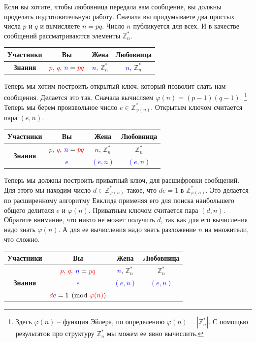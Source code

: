 Если вы хотите, чтобы любовница передала вам сообщение, вы должны проделать подготовительную работу. Сначала вы придумываете два простых числа $p$ и $q$ и вычисляете $n = pq$. Число $n$ публикуется для всех. И в качестве сообщений рассматриваются элементы $\mathbb Z_n^*$.
\begin{center}
\begin{tabular}{|c|c|c|c|}
\hline
{\bf Участники}&{Вы}&{Жена}&{Любовница}\\
\hline
{\bf Знания}&{\textcolor{red}{$p$, $q$}, $\textcolor{blue}{n} = \textcolor{red}{pq}$}&{\textcolor{blue}{$n$}, $\mathbb Z_n^*$}&{\textcolor{blue}{$n$}, $\mathbb Z_n^*$}\\
\hline
\end{tabular}
\end{center}

Теперь мы хотим построить открытый ключ, который позволит слать нам сообщения. Делается это так. Сначала вычисляем $\varphi(n) = (p-1)(q-1)$.%
\footnote{Здесь $\varphi(n)$ -- функция Эйлера, по определению $\varphi(n) = |\mathbb Z_n^*|$. С помощью результатов про структуру $\mathbb Z_n^*$ мы можем ее явно вычислить.}
Теперь мы берем произвольное число $e\in \mathbb Z_{\varphi(n)}^*$. Открытым ключом считается пара $(e, n)$.
\begin{center}
\begin{tabular}{|c|c|c|c|}
\hline
{\bf Участники}&{Вы}&{Жена}&{Любовница}\\
\hline
\multirow{2}{*}{\bf Знания}&{\textcolor{red}{$p$, $q$}, $\textcolor{blue}{n} = \textcolor{red}{pq}$}&{\textcolor{blue}{$n$}, $\mathbb Z_n^*$}&{$\mathbb Z_n^*$}\\
{}&{\textcolor{blue}{$e$}}&{\textcolor{blue}{$(e, n)$}}&{\textcolor{blue}{$(e, n)$}}\\
\hline
\end{tabular}
\end{center}

Теперь мы должны построить приватный ключ, для расшифровки сообщений. Для этого мы находим число $d\in \mathbb Z_{\varphi(n)}^*$ такое, что $de = 1$ в $\mathbb Z_{\varphi(n)}^*$. Это делается по расширенному алгоритму Евклида применяя его для поиска наибольшего общего делителя $e$ и $\varphi(n)$.
Приватным ключом считается пара $(d, n)$. Обратите внимание, что никто не может получить $d$, так как для его вычисления надо знать $\varphi(n)$. А для ее вычисления надо знать разложение $n$ на множители, что сложно.
\begin{center}
\begin{tabular}{|c|c|c|c|}
\hline
{\bf Участники}&{Вы}&{Жена}&{Любовница}\\
\hline
\multirow{3}{*}{\bf Знания}&{\textcolor{red}{$p$, $q$}, $\textcolor{blue}{n} = \textcolor{red}{pq}$}&{\textcolor{blue}{$n$}, $\mathbb Z_n^*$}&{$\mathbb Z_n^*$}\\
{}&{\textcolor{blue}{$e$}}&{\textcolor{blue}{$(e, n)$}}&{\textcolor{blue}{$(e, n)$}}\\
{}&{$\textcolor{red}{d}\textcolor{blue}{e} = 1 \pmod{ \textcolor{red}{\varphi(n)}}$}&{}&{}\\
\hline
\end{tabular}
\end{center}


